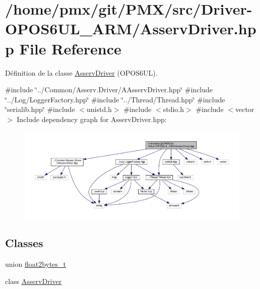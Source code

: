\hypertarget{Driver-OPOS6UL__ARM_2AsservDriver_8hpp}{}\section{/home/pmx/git/\+P\+M\+X/src/\+Driver-\/\+O\+P\+O\+S6\+U\+L\+\_\+\+A\+R\+M/\+Asserv\+Driver.hpp File Reference}
\label{Driver-OPOS6UL__ARM_2AsservDriver_8hpp}


Définition de la classe \hyperlink{classAsservDriver}{Asserv\+Driver} (O\+P\+O\+S6\+UL).  


{\ttfamily \#include \char`\"{}../\+Common/\+Asserv.\+Driver/\+A\+Asserv\+Driver.\+hpp\char`\"{}}\newline
{\ttfamily \#include \char`\"{}../\+Log/\+Logger\+Factory.\+hpp\char`\"{}}\newline
{\ttfamily \#include \char`\"{}../\+Thread/\+Thread.\+hpp\char`\"{}}\newline
{\ttfamily \#include \char`\"{}serialib.\+hpp\char`\"{}}\newline
{\ttfamily \#include $<$unistd.\+h$>$}\newline
{\ttfamily \#include $<$stdio.\+h$>$}\newline
{\ttfamily \#include $<$vector$>$}\newline
Include dependency graph for Asserv\+Driver.\+hpp\+:
\nopagebreak
\begin{figure}[H]
\begin{center}
\leavevmode
\includegraphics[width=350pt]{Driver-OPOS6UL__ARM_2AsservDriver_8hpp__incl}
\end{center}
\end{figure}
\subsection*{Classes}
\begin{DoxyCompactItemize}
\item 
union \hyperlink{unionfloat2bytes__t}{float2bytes\+\_\+t}
\item 
class \hyperlink{classAsservDriver}{Asserv\+Driver}
\end{DoxyCompactItemize}
